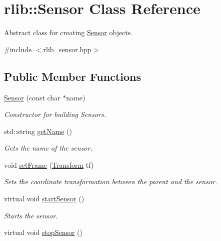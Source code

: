 \hypertarget{classrlib_1_1Sensor}{\section{rlib\-:\-:Sensor Class Reference}
\label{classrlib_1_1Sensor}
}


Abstract class for creating \hyperlink{classrlib_1_1Sensor}{Sensor} objects.  




{\ttfamily \#include $<$rlib\-\_\-sensor.\-hpp$>$}

\subsection*{Public Member Functions}
\begin{DoxyCompactItemize}
\item 
\hyperlink{classrlib_1_1Sensor_a2c91acd4bed299a37f744f67e3ed1c98}{Sensor} (const char $\ast$name)
\begin{DoxyCompactList}\small\item\em Constructor for building Sensors. \end{DoxyCompactList}\item 
std\-::string \hyperlink{classrlib_1_1Sensor_a398dc38404983a823704271bd78434dd}{get\-Name} ()
\begin{DoxyCompactList}\small\item\em Gets the name of the sensor. \end{DoxyCompactList}\item 
void \hyperlink{classrlib_1_1Sensor_a23e53ef67e2ed8c566122576894bba21}{set\-Frame} (\hyperlink{classrlib_1_1Transform}{Transform} tf)
\begin{DoxyCompactList}\small\item\em Sets the coordinate transformation between the parent and the sensor. \end{DoxyCompactList}\item 
\hypertarget{classrlib_1_1Sensor_a921157d5efc532bd008eb7b45ab44bc6}{virtual void \hyperlink{classrlib_1_1Sensor_a921157d5efc532bd008eb7b45ab44bc6}{start\-Sensor} ()}\label{classrlib_1_1Sensor_a921157d5efc532bd008eb7b45ab44bc6}

\begin{DoxyCompactList}\small\item\em Starts the sensor. \end{DoxyCompactList}\item 
\hypertarget{classrlib_1_1Sensor_ae871bf2e5863a0f6501124469b785c56}{virtual void \hyperlink{classrlib_1_1Sensor_ae871bf2e5863a0f6501124469b785c56}{stop\-Sensor} ()}\label{classrlib_1_1Sensor_ae871bf2e5863a0f6501124469b785c56}


\end{DoxyCompactItemize}
